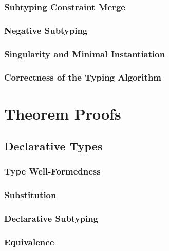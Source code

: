 \subsubsection{Subtyping Constraint Merge}


\subsubsection{Negative Subtyping}


\subsubsection{Singularity and Minimal Instantiation}


\subsubsection{Correctness of the Typing Algorithm}
\label{sec:alg-typing-statements}


\clearpage
\section{Theorem Proofs}
\label{app:proofs}

\subsection{Declarative Types}

\subsubsection{Type Well-Formedness}


\subsubsection{Substitution}


\subsubsection{Declarative Subtyping}


\subsubsection{Equivalence}
\label{sec:decl-equiv-lemmas}


